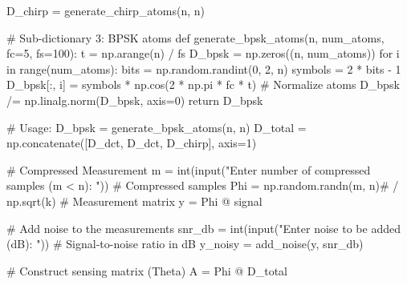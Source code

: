 \documentclass[
  letterpaper,
  DIV=11,
  numbers=noendperiod]{scrartcl}
\newenvironment{Shaded}{\begin{snugshade}}{\end{snugshade}}
\newcommand{\BuiltInTok}[1]{\textcolor[rgb]{0.40,0.85,0.94}{#1}}
\newcommand{\CommentTok}[1]{\textcolor[rgb]{0.46,0.44,0.37}{#1}}
\newcommand{\ControlFlowTok}[1]{\textcolor[rgb]{0.98,0.15,0.45}{#1}}
\newcommand{\DecValTok}[1]{\textcolor[rgb]{0.68,0.51,1.00}{#1}}
\newcommand{\KeywordTok}[1]{\textcolor[rgb]{0.98,0.15,0.45}{#1}}
\newcommand{\NormalTok}[1]{\textcolor[rgb]{0.97,0.97,0.95}{#1}}
\newcommand{\OperatorTok}[1]{\textcolor[rgb]{0.97,0.97,0.95}{#1}}
\newcommand{\StringTok}[1]{\textcolor[rgb]{0.90,0.86,0.45}{#1}}
\begin{document}
\begin{Shaded}
\begin{Highlighting}[]
\NormalTok{D\_chirp }\OperatorTok{=}\NormalTok{ generate\_chirp\_atoms(n, n)}

\CommentTok{\# Sub{-}dictionary 3: BPSK atoms}
\KeywordTok{def}\NormalTok{ generate\_bpsk\_atoms(n, num\_atoms, fc}\OperatorTok{=}\DecValTok{5}\NormalTok{, fs}\OperatorTok{=}\DecValTok{100}\NormalTok{):}
\NormalTok{    t }\OperatorTok{=}\NormalTok{ np.arange(n) }\OperatorTok{/}\NormalTok{ fs}
\NormalTok{    D\_bpsk }\OperatorTok{=}\NormalTok{ np.zeros((n, num\_atoms))}
    \ControlFlowTok{for}\NormalTok{ i }\KeywordTok{in} \BuiltInTok{range}\NormalTok{(num\_atoms):}
\NormalTok{        bits }\OperatorTok{=}\NormalTok{ np.random.randint(}\DecValTok{0}\NormalTok{, }\DecValTok{2}\NormalTok{, n)}
\NormalTok{        symbols }\OperatorTok{=} \DecValTok{2} \OperatorTok{*}\NormalTok{ bits }\OperatorTok{{-}} \DecValTok{1}
\NormalTok{        D\_bpsk[:, i] }\OperatorTok{=}\NormalTok{ symbols }\OperatorTok{*}\NormalTok{ np.cos(}\DecValTok{2} \OperatorTok{*}\NormalTok{ np.pi }\OperatorTok{*}\NormalTok{ fc }\OperatorTok{*}\NormalTok{ t)}
    \CommentTok{\# Normalize atoms}
\NormalTok{    D\_bpsk }\OperatorTok{/=}\NormalTok{ np.linalg.norm(D\_bpsk, axis}\OperatorTok{=}\DecValTok{0}\NormalTok{)}
    \ControlFlowTok{return}\NormalTok{ D\_bpsk}

\CommentTok{\# Usage:}
\NormalTok{D\_bpsk }\OperatorTok{=}\NormalTok{ generate\_bpsk\_atoms(n, n)}
\NormalTok{D\_total }\OperatorTok{=}\NormalTok{ np.concatenate([D\_dct, D\_dct, D\_chirp], axis}\OperatorTok{=}\DecValTok{1}\NormalTok{)}

\CommentTok{\# Compressed Measurement}
\NormalTok{m }\OperatorTok{=} \BuiltInTok{int}\NormalTok{(}\BuiltInTok{input}\NormalTok{(}\StringTok{"Enter number of compressed samples (m \textless{} n): "}\NormalTok{))  }\CommentTok{\# Compressed samples}
\NormalTok{Phi }\OperatorTok{=}\NormalTok{ np.random.randn(m, n)}\CommentTok{\# / np.sqrt(k)  \# Measurement matrix}
\NormalTok{y }\OperatorTok{=}\NormalTok{ Phi }\OperatorTok{@}\NormalTok{ signal}

\CommentTok{\# Add noise to the measurements}
\NormalTok{snr\_db }\OperatorTok{=} \BuiltInTok{int}\NormalTok{(}\BuiltInTok{input}\NormalTok{(}\StringTok{"Enter noise to be added (dB): "}\NormalTok{))  }\CommentTok{\# Signal{-}to{-}noise ratio in dB}
\NormalTok{y\_noisy }\OperatorTok{=}\NormalTok{ add\_noise(y, snr\_db)}

\CommentTok{\# Construct sensing matrix (Theta)}
\NormalTok{A }\OperatorTok{=}\NormalTok{ Phi }\OperatorTok{@}\NormalTok{ D\_total}


\end{Highlighting}
\end{Shaded}
\end{document}
